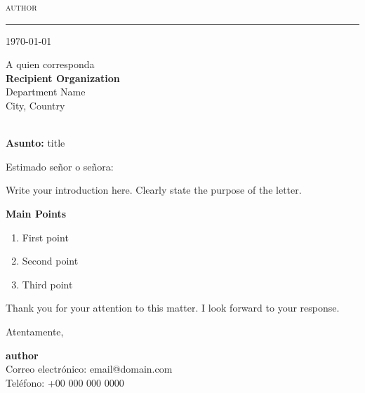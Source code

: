 \documentclass[12pt,letterpaper]{article}
\newcommand{\lblSubject}{Subject}
\newcommand{\lblSalutation}{Dear Sir/Madam:}
\newcommand{\lblClosing}{Sincerely,}
\newcommand{\lblEmail}{Email}
\newcommand{\lblPhone}{Phone}
\newcommand{\lblWhomItMayConcern}{To Whom It May Concern}
\renewcommand{\lblSubject}{Asunto}
\renewcommand{\lblSalutation}{Estimado señor o señora:}
\renewcommand{\lblClosing}{Atentamente,}
\renewcommand{\lblEmail}{Correo electrónico}
\renewcommand{\lblPhone}{Teléfono}
\renewcommand{\lblWhomItMayConcern}{A quien corresponda}}
\begin{document}
  {\scshape\large\color{lettermuted} {{author}} \par}
  \vspace{3pt}
  {\color{lettermark}\rule{\textwidth}{1.6pt}\par}

  \begin{flushright}
    \today
  \end{flushright}

  \vspace{0.5cm}

  \noindent
  \lblWhomItMayConcern\\
  \textbf{Recipient Organization}\\
  Department Name\\
  City, Country\\\

  \vspace{0.5cm}

  \noindent\textcolor{letteraccent}{\textbf{\lblSubject:}} {{{title}}}

  \vspace{0.5cm}

  \noindent \lblSalutation

  \vspace{0.3cm}

  \noindent Write your introduction here. Clearly state the purpose of the letter.

  \vspace{0.5cm}

  \noindent\textbf{Main Points}

  \begin{enumerate}
    \item First point
    \item Second point
    \item Third point
  \end{enumerate}

  \vspace{0.5cm}

  \noindent Thank you for your attention to this matter. I look forward to your response.

  \vspace{1.5cm}

  \noindent\lblClosing

  \vspace{1cm}

  \noindent\textbf{{{author}}}\\
  \textcolor{lettermuted}{\lblEmail:} email@domain.com\\
  \textcolor{lettermuted}{\lblPhone:} +00 000 000 0000
\end{document}
